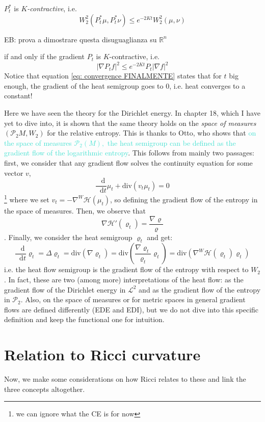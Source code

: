 \documentclass[a4paper,12pt,reqno]{amsbook}
\theoremstyle{definition} %
\newcommand*\de{\mathop{}\!\mathrm{d}}
\newcommand{\1}{\mathbbm{1}}
\newcommand{\mL}{\mathscr{L}}
\newcommand{\mP}{\mathscr{P}}
\newcommand{\cH}{\mathcal{H}} %
\theoremstyle{plain}
\theoremstyle{remark}
\begin{document}
{$P_t^*$ is \emph{$K$-contractive}, i.e.
\[
W_2^2(P_t^* \mu, P_t^* \nu) \le e^{-2Kt}W_2^2(\mu,\nu)
\]

{\color{blue}
EB: prova a dimostrare questa disuguaglianza su $\mathbb R^n$
}

if and only if the gradient $P_t$ is $K$-contractive, i.e.
\begin{equation}\label{eq: convergence FINALMENTE}
    |\nabla P_t f|^2 \le e^{-2Kt}P_t|\nabla f|^2
\end{equation}
Notice that equation \ref{eq: convergence FINALMENTE} states that for $t$ big enough, the gradient of the heat semigroup goes to 0, i.e. \textcolor{WildStrawberry}{heat converges to a constant!}

\begin{remark}
    Here we have seen the theory for the Dirichlet energy. In chapter 18, which I have yet to dive into, it is shown that the same theory holds on the \textit{space of measures} $(\mP_2M,W_2)$ for the relative entropy. This is thanks to Otto, who shows that \textcolor{Turquoise}{on the space of measures $\mP_2(M),$ the heat semigroup can be defined as the gradient flow of the logarithmic entropy}. This follows from mainly two passages: first, we consider that any gradient flow solves the continuity equation for some vector $v$,\[\frac{\de}{\de{t}} \mu_t + \text{div}(v_t\mu_t)=0\]\footnote{we can ignore what the CE is for now} where we set $v_t = -\nabla^W \cH(\mu_t)$, so defining the gradient flow of the entropy in the space of measures. Then, we observe that \[\nabla \cH'(\varrho_t)=\frac{\nabla \varrho}{\varrho}\]. Finally, we consider the heat semigroup $\varrho_t$ and get: \[\frac{\de}{\de{t}} \varrho_t=\Delta \varrho_t = \text{div}(\nabla \varrho_t) =  \text{div}(\frac{\nabla \varrho_t}{\varrho_t}\varrho_t)=\text{div}(\nabla^W \cH(\varrho_t)\varrho_t)\] i.e. the heat flow semigroup is the gradient flow of the entropy with respect to $W_2$. In fact, these are two (among more) interpretations of the heat flow: as the gradient flow of the Dirichlet energy in $\mL^2$ and as the gradient flow of the entropy in $\mP_2$.
    Also, on the space of measures or for metric spaces in general gradient flows are defined differently (EDE and EDI), but we do not dive into this specific definition and keep the functional one for intuition. 
\end{remark}

\section{Relation to Ricci curvature}
Now, we make some considerations on how Ricci relates to these and link the three concepts altogether.

}
\end{document}
